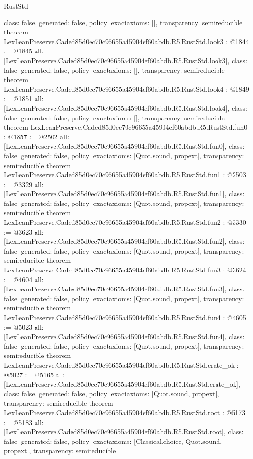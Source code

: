 \begin{lexlean}{RustStd}
\begin{coremodule}
{  class: false,
  generated: false,
  policy: exact{axioms: []},
  transparency: semireducible
}
theorem LexLeanPreserve.Caded85d0ec70c96655a45904ef60abdb.R5.RustStd.look3 : @1844 := @1845 {
  all: [LexLeanPreserve.Caded85d0ec70c96655a45904ef60abdb.R5.RustStd.look3],
  class: false,
  generated: false,
  policy: exact{axioms: []},
  transparency: semireducible
}
theorem LexLeanPreserve.Caded85d0ec70c96655a45904ef60abdb.R5.RustStd.look4 : @1849 := @1851 {
  all: [LexLeanPreserve.Caded85d0ec70c96655a45904ef60abdb.R5.RustStd.look4],
  class: false,
  generated: false,
  policy: exact{axioms: []},
  transparency: semireducible
}
theorem LexLeanPreserve.Caded85d0ec70c96655a45904ef60abdb.R5.RustStd.fun0 : @1857 := @2502 {
  all: [LexLeanPreserve.Caded85d0ec70c96655a45904ef60abdb.R5.RustStd.fun0],
  class: false,
  generated: false,
  policy: exact{axioms: [Quot.sound, propext]},
  transparency: semireducible
}
theorem LexLeanPreserve.Caded85d0ec70c96655a45904ef60abdb.R5.RustStd.fun1 : @2503 := @3329 {
  all: [LexLeanPreserve.Caded85d0ec70c96655a45904ef60abdb.R5.RustStd.fun1],
  class: false,
  generated: false,
  policy: exact{axioms: [Quot.sound, propext]},
  transparency: semireducible
}
theorem LexLeanPreserve.Caded85d0ec70c96655a45904ef60abdb.R5.RustStd.fun2 : @3330 := @3623 {
  all: [LexLeanPreserve.Caded85d0ec70c96655a45904ef60abdb.R5.RustStd.fun2],
  class: false,
  generated: false,
  policy: exact{axioms: [Quot.sound, propext]},
  transparency: semireducible
}
theorem LexLeanPreserve.Caded85d0ec70c96655a45904ef60abdb.R5.RustStd.fun3 : @3624 := @4604 {
  all: [LexLeanPreserve.Caded85d0ec70c96655a45904ef60abdb.R5.RustStd.fun3],
  class: false,
  generated: false,
  policy: exact{axioms: [Quot.sound, propext]},
  transparency: semireducible
}
theorem LexLeanPreserve.Caded85d0ec70c96655a45904ef60abdb.R5.RustStd.fun4 : @4605 := @5023 {
  all: [LexLeanPreserve.Caded85d0ec70c96655a45904ef60abdb.R5.RustStd.fun4],
  class: false,
  generated: false,
  policy: exact{axioms: [Quot.sound, propext]},
  transparency: semireducible
}
theorem LexLeanPreserve.Caded85d0ec70c96655a45904ef60abdb.R5.RustStd.crate_ok : @5027 := @5165 {
  all: [LexLeanPreserve.Caded85d0ec70c96655a45904ef60abdb.R5.RustStd.crate_ok],
  class: false,
  generated: false,
  policy: exact{axioms: [Quot.sound, propext]},
  transparency: semireducible
}
theorem LexLeanPreserve.Caded85d0ec70c96655a45904ef60abdb.R5.RustStd.root : @5173 := @5183 {
  all: [LexLeanPreserve.Caded85d0ec70c96655a45904ef60abdb.R5.RustStd.root],
  class: false,
  generated: false,
  policy: exact{axioms: [Classical.choice, Quot.sound, propext]},
  transparency: semireducible
}


\end{coremodule}
\end{lexlean}
